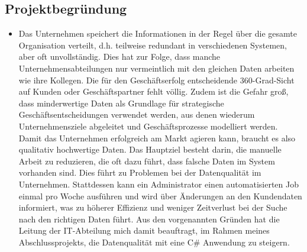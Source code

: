 \subsection{Projektbegründung} 
\label{sec:Projektbegruendung}
\begin{itemize}
	\item Das Unternehmen speichert die Informationen in der Regel über die gesamte Organisation verteilt, d.h. teilweise redundant in verschiedenen Systemen, aber oft unvollständig.
	Dies hat zur Folge, dass manche Unternehmensabteilungen nur vermeintlich mit den gleichen Daten arbeiten wie ihre Kollegen.
	Die für den Geschäftserfolg entscheidende 360-Grad-Sicht auf Kunden oder Geschäftspartner fehlt völlig. Zudem ist die Gefahr groß,
	dass minderwertige Daten als Grundlage für strategische Geschäftsentscheidungen verwendet werden, aus denen wiederum Unternehmensziele abgeleitet und Geschäftsprozesse modelliert werden. 
	Damit das Unternehmen erfolgreich am Markt agieren kann, braucht es also qualitativ hochwertige Daten.
	Das Hauptziel besteht darin, die manuelle Arbeit zu reduzieren, die oft dazu führt, dass falsche Daten im System vorhanden sind. Dies führt zu Problemen bei der Datenqualität im Unternehmen. 
	Stattdessen kann ein Administrator einen automatisierten Job einmal pro Woche ausführen und wird über Änderungen an den Kundendaten informiert, was zu höherer Effizienz und weniger Zeitverlust bei der Suche nach den richtigen Daten führt.
	Aus den vorgenannten Gründen hat die Leitung der IT-Abteilung mich damit beauftragt, im Rahmen meines Abschlussprojekts, die Datenqualität mit eine C# Anwendung zu steigern.
\end{itemize}


